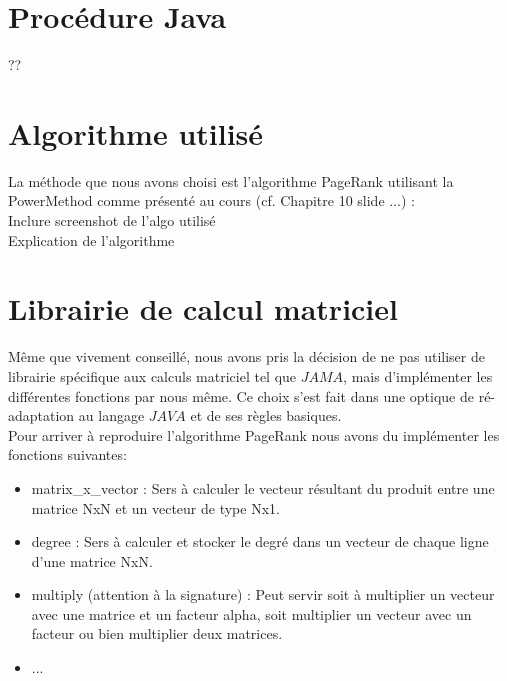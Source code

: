 \documentclass[10pt,a4paper]{article}
\begin{document}



\newpage

\section{Procédure Java}
??
\section{Algorithme utilisé}
La méthode que nous avons choisi est l'algorithme PageRank utilisant la PowerMethod comme présenté au cours (cf. Chapitre 10 slide ...) :
\\ Inclure screenshot de l'algo utilisé
\\Explication de l'algorithme

\section{Librairie de calcul matriciel}
Même que vivement conseillé, nous avons pris la décision de ne pas utiliser de librairie spécifique aux calculs matriciel tel que $JAMA$, mais d'implémenter les différentes fonctions par nous même. Ce choix s'est fait dans une optique de ré-adaptation au langage $JAVA$ et de ses règles basiques. %
\\ Pour arriver à reproduire l'algorithme PageRank nous avons du implémenter les fonctions suivantes:
\begin{itemize}
    \item matrix_x_vector : Sers à calculer le vecteur résultant du produit entre une matrice NxN et un vecteur de type Nx1.
    \item degree : Sers à calculer et stocker le degré dans un vecteur de chaque ligne d'une matrice NxN.
    \item multiply (attention à la signature) : Peut servir soit à multiplier un vecteur avec une matrice et un facteur alpha, soit multiplier un vecteur avec un facteur ou bien multiplier deux matrices.
    \item ...
\end{itemize}
\end{document}

